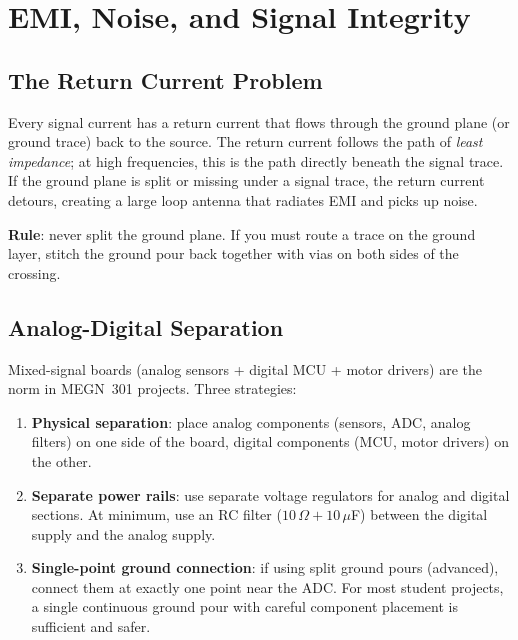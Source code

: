 \section{EMI, Noise, and Signal Integrity}

\subsection{The Return Current Problem}
Every signal current has a return current that flows through the ground plane (or ground trace) back to the source. The return current follows the path of \emph{least impedance}; at high frequencies, this is the path directly beneath the signal trace. If the ground plane is split or missing under a signal trace, the return current detours, creating a large loop antenna that radiates EMI and picks up noise.

\textbf{Rule}: never split the ground plane. If you must route a trace on the ground layer, stitch the ground pour back together with vias on both sides of the crossing.

\subsection{Analog-Digital Separation}
Mixed-signal boards (analog sensors + digital MCU + motor drivers) are the norm in MEGN~301 projects. Three strategies:
\begin{enumerate}[nosep,leftmargin=1.5em]
\item \textbf{Physical separation}: place analog components (sensors, ADC, analog filters) on one side of the board, digital components (MCU, motor drivers) on the other.
\item \textbf{Separate power rails}: use separate voltage regulators for analog and digital sections. At minimum, use an RC filter ($10\,\Omega + 10\,\mu$F) between the digital supply and the analog supply.
\item \textbf{Single-point ground connection}: if using split ground pours (advanced), connect them at exactly one point near the ADC. For most student projects, a single continuous ground pour with careful component placement is sufficient and safer.
\end{enumerate}

